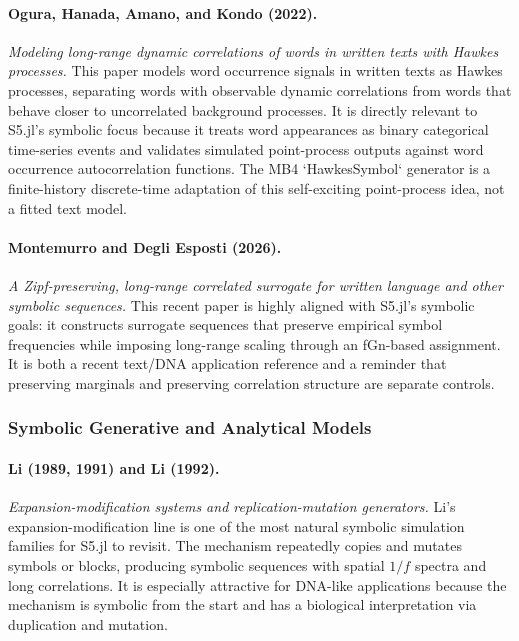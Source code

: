 \documentclass[11pt]{article}
\begin{document}
\paragraph{Ogura, Hanada, Amano, and Kondo (2022).}
\emph{Modeling long-range dynamic correlations of words in written texts with
Hawkes processes.}
This paper models word occurrence signals in written texts as Hawkes processes,
separating words with observable dynamic correlations from words that behave
closer to uncorrelated background processes. It is directly relevant to S5.jl's
symbolic focus because it treats word appearances as binary categorical
time-series events and validates simulated point-process outputs against word
occurrence autocorrelation functions. The MB4 `HawkesSymbol` generator is a
finite-history discrete-time adaptation of this self-exciting point-process
idea, not a fitted text model.

\paragraph{Montemurro and Degli Esposti (2026).}
\emph{A Zipf-preserving, long-range correlated surrogate for written language
and other symbolic sequences.}
This recent paper is highly aligned with S5.jl's symbolic goals: it constructs
surrogate sequences that preserve empirical symbol frequencies while imposing
long-range scaling through an fGn-based assignment. It is both a recent text/DNA
application reference and a reminder that preserving marginals and preserving
correlation structure are separate controls.

\subsubsection{Symbolic Generative and Analytical Models}

\paragraph{Li (1989, 1991) and Li (1992).}
\emph{Expansion-modification systems and replication-mutation generators.}
Li's expansion-modification line is one of the most natural symbolic simulation
families for S5.jl to revisit. The mechanism repeatedly copies and mutates
symbols or blocks, producing symbolic sequences with spatial $1/f$ spectra and
long correlations. It is especially attractive for DNA-like applications because
the mechanism is symbolic from the start and has a biological interpretation via
duplication and mutation.
\end{document}
